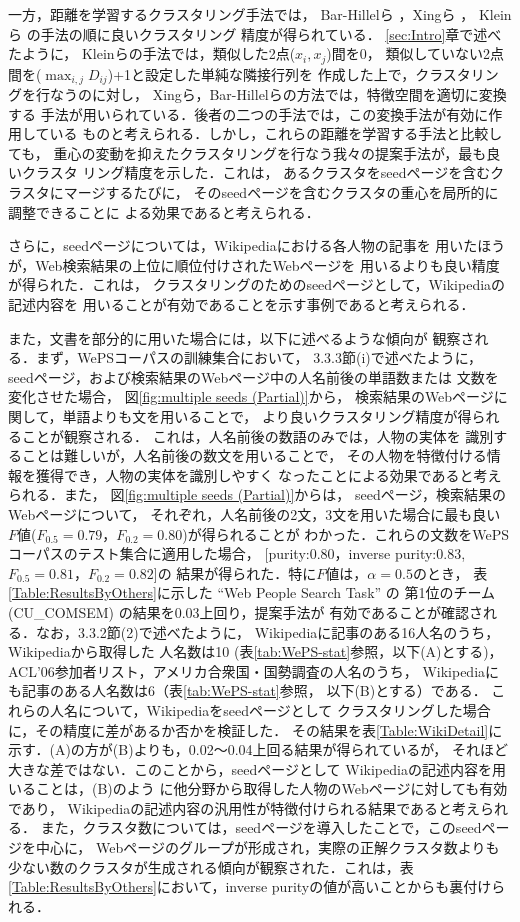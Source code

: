 \documentclass[japanese]{jnlp_1.4}
\begin{document}
一方，距離を学習するクラスタリング手法では，
Bar-Hillelら \cite{Bar-Hillel03}，Xingら \cite{Xing03}，
Kleinら \cite{Klein02} の手法の順に良いクラスタリング
精度が得られている．
\ref{sec:Intro}章で述べたように，
Kleinらの手法では，類似した2点($x_{i},x_{j}$)間を0，
類似していない2点間を($\max_{i,j} D_{ij}$)+1と設定した単純な隣接行列を
作成した上で，クラスタリングを行なうのに対し，
Xingら，Bar-Hillelらの方法では，特徴空間を適切に変換する
手法が用いられている．後者の二つの手法では，この変換手法が有効に作用している
ものと考えられる．しかし，これらの距離を学習する手法と比較しても，
重心の変動を抑えたクラスタリングを行なう我々の提案手法が，最も良いクラスタ
リング精度を示した．これは，
あるクラスタをseedページを含むクラスタにマージするたびに，
そのseedページを含むクラスタの重心を局所的に調整できることに
よる効果であると考えられる．

さらに，seedページについては，Wikipediaにおける各人物の記事を
用いたほうが，Web検索結果の上位に順位付けされたWebページを
用いるよりも良い精度が得られた．これは，
クラスタリングのためのseedページとして，Wikipediaの記述内容を
用いることが有効であることを示す事例であると考えられる．

また，文書を部分的に用いた場合には，以下に述べるような傾向が
観察される．まず，WePSコーパスの訓練集合において，
3.3.3節(i)で述べたように，
seedページ，および検索結果のWebページ中の人名前後の単語数または
文数を変化させた場合，
図\ref{fig:multiple seeds (Partial)}から，
検索結果のWebページに関して，単語よりも文を用いることで，
より良いクラスタリング精度が得られることが観察される．
これは，人名前後の数語のみでは，人物の実体を
識別することは難しいが，人名前後の数文を用いることで，
その人物を特徴付ける情報を獲得でき，人物の実体を識別しやすく
なったことによる効果であると考えられる．また，
図\ref{fig:multiple seeds (Partial)}からは，
seedページ，検索結果のWebページについて，
それぞれ，人名前後の2文，3文を用いた場合に最も良い
$F$値($F_{0.5}=0.79$，$F_{0.2}=0.80$)が得られることが
わかった．これらの文数をWePSコーパスのテスト集合に適用した場合，
[purity:0.80，inverse purity:0.83, $F_{0.5}=0.81$，$F_{0.2}=0.82$]の
結果が得られた．特に$F$値は，$\alpha=0.5$のとき，
表\ref{Table:ResultsByOthers}に示した
``Web People Search Task'' \cite{Artiles07} の
第1位のチーム (CU\_COMSEM) の結果を0.03上回り，提案手法が
有効であることが確認される．なお，3.3.2節(2)で述べたように，
Wikipediaに記事のある16人名のうち，Wikipediaから取得した
人名数は10 (表\ref{tab:WePS-stat}参照，以下(A)とする)，
ACL'06参加者リスト，アメリカ合衆国・国勢調査の人名のうち，
Wikipediaにも記事のある人名数は6（表\ref{tab:WePS-stat}参照，
以下(B)とする）である．
これらの人名について，Wikipediaをseedページとして
クラスタリングした場合に，その精度に差があるか否かを検証した．
その結果を表\ref{Table:WikiDetail}に
示す．(A)の方が(B)よりも，0.02〜0.04上回る結果が得られているが，
それほど大きな差ではない．このことから，seedページとして
Wikipediaの記述内容を用いることは，(B)のよう
に他分野から取得した人物のWebページに対しても有効であり，
Wikipediaの記述内容の汎用性が特徴付けられる結果であると考えられる．
また，クラスタ数については，seedページを導入したことで，このseedページを中心に，
Webページのグループが形成され，実際の正解クラスタ数よりも
少ない数のクラスタが生成される傾向が観察された．これは，表
\ref{Table:ResultsByOthers}において，inverse purityの値が高いことからも裏付けられる．
\end{document}
